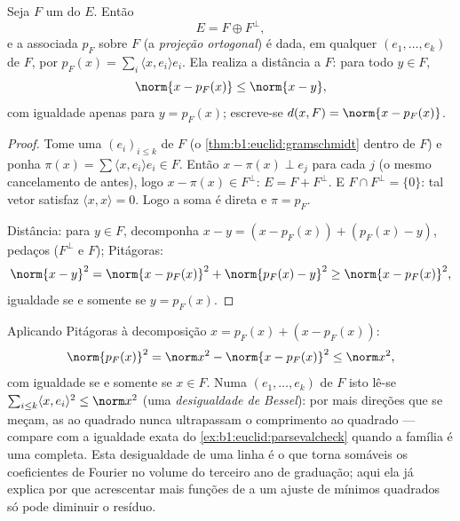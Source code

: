 \begin{theorem}\label{thm:b1:euclid:projection}
Seja $F$ um  do  $E$. Então
\[
E = F \oplus F^{\perp},
\]
e a  associada $p_F$ sobre $F$ (a \emph{projeção
ortogonal}) é dada, em qualquer 
 $(e_1, \dots, e_k)$ de $F$, por $p_F(x) = \sum_i
\langle x, e_i\rangle e_i$. Ela realiza a distância a $F$:
para todo $y \in F$,
\[
\norm{x - p_F(x)} \leq \norm{x - y},
\]
com igualdade apenas para $y = p_F(x)$; escreve-se $d(x, F) = \norm{x -
p_F(x)}$.
\end{theorem}

\begin{proof}
Tome uma   $(e_i)_{i \leq k}$ de $F$ (o \cref{thm:b1:euclid:gramschmidt} dentro de $F$) e
ponha $\pi(x) =
\sum \langle x, e_i\rangle e_i \in F$. Então $x - \pi(x) \perp e_j$ para cada $j$ (o mesmo cancelamento de
antes), logo $x - \pi(x) \in
F^\perp$: $E = F + F^\perp$. E $F \cap F^\perp = \{0\}$: tal vetor satisfaz $\langle x, x\rangle = 0$. Logo a
soma é direta e $\pi = p_F$.

Distância: para $y \in F$, decomponha $x - y = (x - p_F(x)) + (p_F(x) -
y)$, pedaços 
($F^\perp$ e $F$); Pitágoras:
\[
\norm{x - y}^2 = \norm{x - p_F(x)}^2 + \norm{p_F(x) - y}^2
\geq \norm{x - p_F(x)}^2,
\]
igualdade se e somente se $y = p_F(x)$.
\end{proof}

\begin{example}
\label{ex:b1:euclid:bessel}
Aplicando Pitágoras à decomposição $x = p_F(x) + (x - p_F(x))$:
\[
\norm{p_F(x)}^2 = \norm x^2 - \norm{x - p_F(x)}^2 \leq
\norm x^2 ,
\]
com igualdade se e somente se $x \in F$. Numa   $(e_1,
\dots, e_k)$
de $F$ isto lê-se $\sum_{i \leq k}\langle x,
e_i\rangle^2 \leq \norm x^2$ (uma \emph{desigualdade de Bessel}): por
mais direções  que se meçam, as  ao quadrado
nunca ultrapassam o comprimento ao quadrado --- compare com a
igualdade exata do \cref{ex:b1:euclid:parsevalcheck} quando a família é uma  completa. Esta
desigualdade de uma linha é o que torna somáveis os coeficientes de
Fourier no volume do terceiro ano de graduação; aqui ela já explica
por que acrescentar mais funções de  a um ajuste de mínimos
quadrados só pode diminuir o resíduo.
\end{example}

